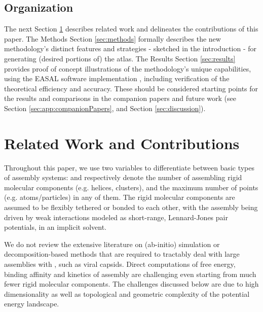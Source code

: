 \documentclass[]{article}
\begin{document}
\subsection*{Organization}
The next Section \ref{sec:related} describes related work and delineates the
contributions of this paper. The Methods Section \ref{sec:methods} formally
describes the new methodology's distinct features and strategies - sketched in
the introduction - for generating (desired portions of) the atlas. The Results
Section \ref{sec:results} provides proof of concept illustrations of the
methodology's unique capabilities, using the EASAL software implementation
\cite{Ozkan:toms,easalVideo,easalSoftware}, including verification of the
theoretical efficiency and accuracy. These should be considered starting points
for the results and comparisons in the companion papers and future work (see
Section \ref{sec:app:companionPapers}, and Section \ref{sec:discussion}).



\section{Related Work and Contributions}
\label{sec:related}
Throughout this paper, we use two variables to differentiate between basic
types of assembly systems:  and  respectively denote the number of
assembling rigid molecular components (e.g. helices, clusters), and the maximum
number of points (e.g. atoms/particles) in any of them. The rigid molecular
components are assumed to be flexibly tethered or bonded to each other, with
the assembly being driven by weak interactions modeled as short-range,
Lennard-Jones pair potentials, in an implicit solvent.

We do not review the extensive literature on (ab-initio) simulation or
decomposition-based methods that are required to tractably deal with large
assemblies with , such as viral capsids. Direct computations of free
energy, binding affinity and kinetics of assembly are challenging even starting
from much fewer rigid molecular components. The challenges discussed below are
due to high dimensionality as well as topological and geometric complexity of
the potential energy landscape. 
\end{document}
